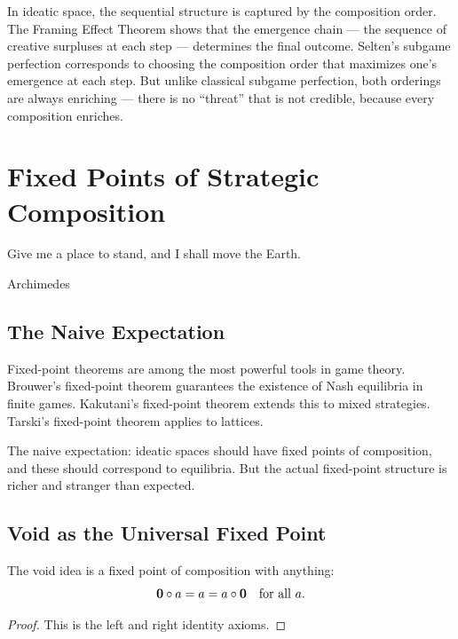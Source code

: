 In ideatic space, the sequential structure is captured by the composition order. The Framing Effect Theorem shows that the emergence chain --- the sequence of creative surpluses at each step --- determines the final outcome. Selten's subgame perfection corresponds to choosing the composition order that maximizes one's emergence at each step. But unlike classical subgame perfection, both orderings are always enriching --- there is no ``threat'' that is not credible, because every composition enriches.


\chapter{Fixed Points of Strategic Composition}

\epigraph{Give me a place to stand, and I shall move the Earth.}{Archimedes}

\section{The Naive Expectation}

Fixed-point theorems are among the most powerful tools in game theory. Brouwer's fixed-point theorem guarantees the existence of Nash equilibria in finite games. Kakutani's fixed-point theorem extends this to mixed strategies. Tarski's fixed-point theorem applies to lattices.

The naive expectation: ideatic spaces should have fixed points of composition, and these should correspond to equilibria. But the actual fixed-point structure is richer and stranger than expected.

\section{Void as the Universal Fixed Point}

\begin{theorem}
\label{thm:void-fixed-point}
The void idea is a fixed point of composition with anything:
\[
\mathbf{0} \circ a = a = a \circ \mathbf{0} \quad \text{for all } a.
\]
\end{theorem}

\begin{proof}
This is the left and right identity axioms.
\end{proof}

